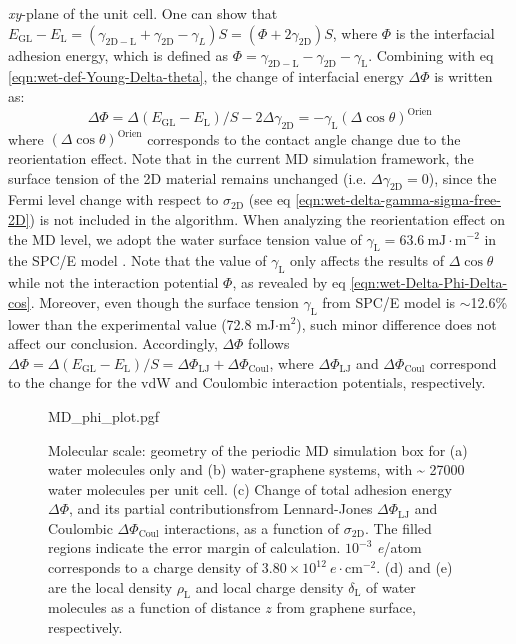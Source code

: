 \emph{xy}-plane of the unit cell.
%
One can show that
\(E_{\mathrm{GL}} - E_{\mathrm{L}} = (\gamma_{\mathrm{2D-L}} +
\gamma_{\mathrm{2D}} - \gamma_{L})S = (\Phi + 2
\gamma_{\mathrm{2D}})S\), where \(\Phi\) is the interfacial adhesion energy,
which is defined as
\(\Phi = \gamma_{\mathrm{2D-L}} - \gamma_{\mathrm{2D}} -
\gamma_{\mathrm{L}}\).
Combining with eq
\autoref{eqn:wet-def-Young-Delta-theta}, the change of interfacial
energy \(\Delta \Phi\) is written as:
\begin{equation}
\label{eqn:wet-Delta-Phi-Delta-cos}
\Delta \Phi = \Delta (E_{\mathrm{GL}} - E_{\mathrm{L}})/S - 2\Delta \gamma_{\mathrm{2D}} = -\gamma_{\mathrm{L}} (\Delta \cos \theta)^{\mathrm{Orien}}
\end{equation}
where \((\Delta\cos \theta)^{\mathrm{Orien}}\) corresponds to the
contact angle change due to the reorientation effect.
%
Note that in the
current MD simulation framework, the surface tension of the 2D material
remains unchanged (i.e.  \(\Delta \gamma_{\mathrm{2D}}=0\)), since the
Fermi level change with respect to \(\sigma_{\mathrm{2D}}\) (see eq
\autoref{eqn:wet-delta-gamma-sigma-free-2D}) is not included in the algorithm.
%
When analyzing the reorientation effect on the MD level, we adopt the
water surface tension value of
\(\gamma_{\mathrm{L}}=63.6\ \mathrm{mJ}\cdot \mathrm{m}^{-2}\) in the
SPC/E model \cite{Vega_2007_tension}.
%
Note that the value of
\(\gamma_{\mathrm{L}}\) only affects the results of
\(\Delta \cos \theta\) while not the interaction potential \(\Phi\), as revealed by eq
\autoref{eqn:wet-Delta-Phi-Delta-cos}.
%
Moreover, even though the surface tension $\gamma_{\mathrm{L}}$ from
SPC/E model is $\sim{}$12.6\% lower than the experimental value (72.8
mJ\(\cdot\)m\(^2\)), such minor difference does not affect our
conclusion.
%
Accordingly, \(\Delta \Phi\) follows
\(\Delta \Phi = \Delta (E_{\mathrm{GL}} - E_{\mathrm{L}})/S = \Delta
\Phi_{\mathrm{LJ}} + \Delta \Phi_{\mathrm{Coul}}\), where
\(\Delta \Phi_{\mathrm{LJ}}\) and \(\Delta \Phi_{\mathrm{Coul}}\)
correspond to the change for the vdW and Coulombic interaction
potentials, respectively.

\begin{figure}[!htbp]
  \centering
  {MD_phi_plot.pgf}
\caption{\label{fig:wet-MD-res1}  Molecular scale: geometry of the periodic
  MD simulation box for (a) water molecules only and (b)
  water-graphene systems, with \textasciitilde{} 27000 water molecules
  per unit cell. (c) Change of total adhesion energy \(\Delta\Phi\),
  and its partial contributionsfrom Lennard-Jones
  \(\Delta\Phi_{\mathrm{LJ}}\) and Coulombic
  \(\Delta\Phi_{\mathrm{Coul}}\) interactions, as a function of
  \(\sigma_{\mathrm{2D}}\). The filled regions indicate the error
  margin of calculation. \(10^{-3}\) \textit{e}/atom corresponds to a
  charge density of \(3.80 \times 10^{12}\ e \cdot
  \mathrm{cm}^{-2}\). (d) and (e) are the local density
  \(\rho_{\mathrm{L}}\) and local charge density
  \(\delta_{\mathrm{L}}\) of water molecules as a function of distance
  \(z\) from graphene surface, respectively.}
\end{figure}

